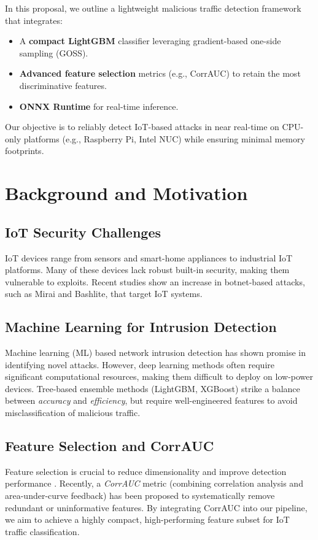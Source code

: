 \documentclass[12pt]{article}
\begin{document}
In this proposal, we outline a lightweight malicious traffic detection framework that integrates:
\begin{itemize}
    \item A \textbf{compact LightGBM} classifier leveraging gradient-based one-side sampling (GOSS).
    \item \textbf{Advanced feature selection} metrics (e.g., CorrAUC) to retain the most discriminative features.
    \item \textbf{ONNX Runtime} for real-time inference.
\end{itemize}

Our objective is to reliably detect IoT-based attacks in near real-time on CPU-only platforms (e.g., Raspberry Pi, Intel NUC) while ensuring minimal memory footprints. 


\section{Background and Motivation}

\subsection{IoT Security Challenges}
IoT devices range from sensors and smart-home appliances to industrial IoT platforms. 
Many of these devices lack robust built-in security, making them vulnerable to exploits.
Recent studies show an increase in botnet-based attacks, such as Mirai and Bashlite, that target IoT systems.

\subsection{Machine Learning for Intrusion Detection}
Machine learning (ML) based network intrusion detection has shown promise in identifying novel attacks. 
However, deep learning methods often require significant computational resources, making them difficult to deploy on low-power devices. 
Tree-based ensemble methods (LightGBM, XGBoost) strike a balance between \emph{accuracy} and \emph{efficiency}, but require well-engineered features to avoid misclassification of malicious traffic.

\subsection{Feature Selection and CorrAUC}
Feature selection is crucial to reduce dimensionality and improve detection performance \cite{shafiq2021corrAUC}. 
Recently, a \emph{CorrAUC} metric (combining correlation analysis and area-under-curve feedback) has been proposed to systematically remove redundant or uninformative features. 
By integrating CorrAUC into our pipeline, we aim to achieve a highly compact, high-performing feature subset for IoT traffic classification.
\end{document}
